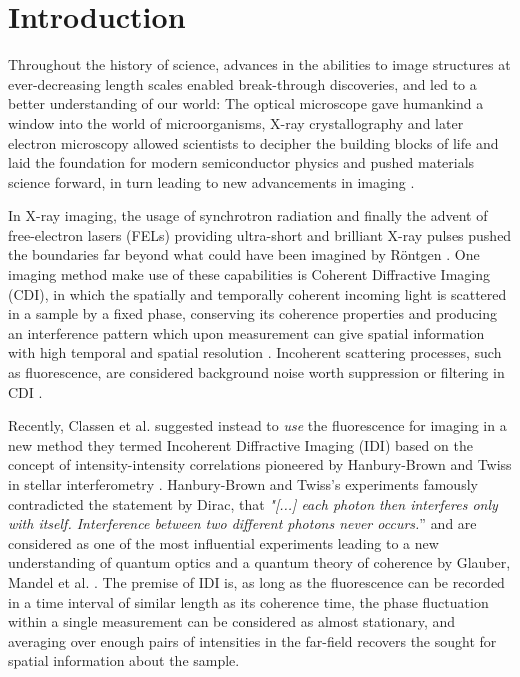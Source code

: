 \chapter{Introduction}
Throughout the history of science, advances in the abilities to image structures at ever-decreasing length scales enabled break-through discoveries, and led to a better understanding of our world:
The optical microscope gave humankind a window into the world of microorganisms, X-ray crystallography and later electron microscopy allowed scientists to decipher the building blocks of life and laid the foundation for modern semiconductor physics and pushed materials science forward, in turn leading to new advancements in imaging \cite{hooke1665,laue1915,ruska1939,watson1953,hovmoeller1984}.

In X-ray imaging, the usage of synchrotron radiation and finally the advent of free-electron lasers (FELs) providing ultra-short and brilliant X-ray pulses pushed the boundaries far beyond what could have been imagined by Röntgen \cite{cloetens1996,emma2010}. One imaging method make use of these capabilities is Coherent Diffractive Imaging (CDI), in which the spatially and temporally coherent incoming light is scattered in a sample by a fixed phase, conserving its coherence properties and producing an interference pattern which upon measurement can give spatial information with high temporal and spatial resolution \cite{seibert2011,bostedt2010,barke2015}. Incoherent scattering processes, such as fluorescence, are considered background noise worth suppression or filtering in CDI \cite{schultz2013chapter7}. 

Recently, Classen et al. suggested instead to \textit{use} the fluorescence for imaging in a new method they termed Incoherent Diffractive Imaging (IDI) \cite{classen2017} based on the concept of intensity-intensity correlations pioneered by Hanbury-Brown and Twiss in stellar interferometry \cite{hanbury1956}.  Hanbury-Brown and Twiss's experiments famously contradicted the statement by Dirac, that \textit{"[...] each photon then interferes only with itself. Interference between two different photons never occurs.}” \cite{dirac1958} and are considered as one of the most influential experiments leading to a new understanding of quantum optics and a quantum theory of coherence by Glauber, Mandel et al. \cite{glauber1963,mandel1959, hong1987,glauber2006}.  The premise of IDI is, as long as the fluorescence can be recorded in a time interval of similar length as its coherence time, the phase fluctuation within a single measurement can be considered as almost stationary, and averaging over enough pairs of intensities in the far-field recovers the sought for spatial information about the sample.

